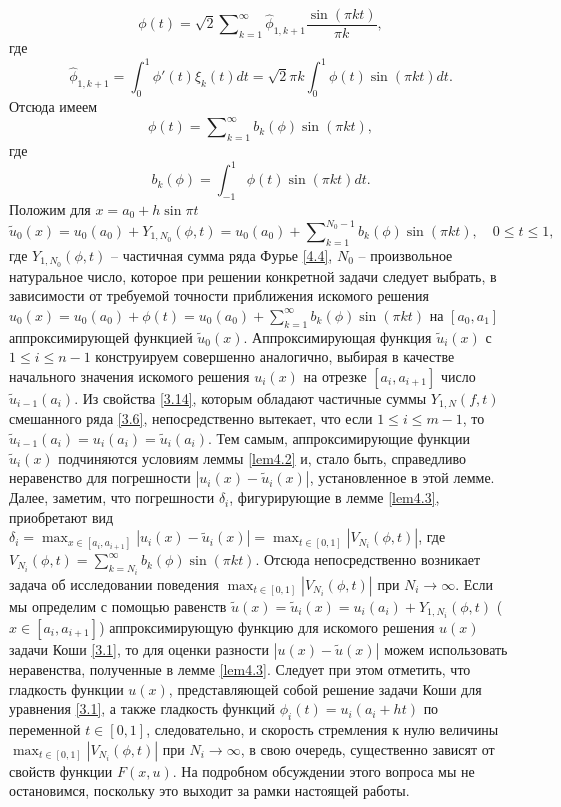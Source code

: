 \documentclass{article}
\numberwithin{equation}{section}
\theoremstyle{plain}
\theoremstyle{definition}
\begin{document}
\begin{fulltext}
$$
\phi(t)= \sqrt{2} \sum\nolimits_{k=1}^\infty \hat \phi_{1,k+1}\frac{\sin(\pi kt)}{\pi k},
$$
где
$$
\hat \phi_{1,k+1}=\int_{0}^1 \phi'(t)\xi_{k}(t)dt=
\sqrt{2}\pi k\int_{0}^1 \phi(t)\sin(\pi kt)dt.
$$
Отсюда имеем
\begin{equation}\label{4.4}
\phi(t)=  \sum\nolimits_{k=1}^\infty b_k(\phi)\sin(\pi kt),
\end{equation}
где
$$
b_k(\phi)=\int_{-1}^1 \phi(t)\sin(\pi kt)dt.
$$
Положим для $x=a_0+h\sin\pi t$
$$
\tilde u_0(x)=u_0(a_0)+Y_{1,N_0}(\phi, t)=u_0(a_0)+ \sum\nolimits_{k=1}^{N_0-1} b_k(\phi)\sin(\pi kt),\quad 0\le t\le 1,
$$
где $Y_{1,N_0}(\phi, t)$ -- частичная сумма ряда Фурье \eqref{4.4}, $N_0$ -- произвольное натуральное число, которое при решении конкретной задачи следует  выбрать, в зависимости от требуемой точности приближения искомого решения $u_0(x)=u_0(a_0)+\phi(t)=  u_0(a_0)+\sum\nolimits_{k=1}^\infty b_k(\phi)\sin(\pi kt)$ на $[a_0,a_1]$ аппроксимирующей функцией $\tilde u_0(x)$.  Аппроксимирующая функция $\tilde u_i(x)$ с  $1\le i\le n-1$ конструируем совершенно аналогично, выбирая в качестве  начального значения искомого решения $u_i(x)$ на отрезке $[a_i,a_{i+1}]$ число $\tilde u_{i-1}(a_i)$.
Из свойства \eqref{3.14}, которым обладают частичные суммы $Y_{1,N}(f,t)$ смешанного ряда \eqref{3.6}, непосредственно вытекает, что если $1\le i\le m-1$, то $\tilde u_{i-1}(a_i)=u_i(a_i)=\tilde u_i(a_i)$. Тем самым, аппроксимирующие функции  $\tilde u_i(x)$ подчиняются условиям леммы \ref{lem4.2} и, стало быть, справедливо неравенство для погрешности $ |u_i(x)-\tilde u_i(x)|$, установленное в этой лемме. Далее, заметим, что погрешности   $\delta_i $, фигурирующие в лемме  \ref{lem4.3}, приобретают вид $\delta_i=\max_{x\in[a_i,a_{i+1}]}|u_i(x)-\tilde u_i(x)|=\max_{t\in[0,1]}|V_{N_i}(\phi,t)|$, где
 $V_{N_i}(\phi,t)=\sum\nolimits_{k=N_i}^\infty b_k(\phi)\sin(\pi kt)$. Отсюда непосредственно возникает задача об исследовании поведения $\max_{t\in[0,1]}|V_{N_i}(\phi,t)|$ при $N_i\to\infty$.   Если мы определим  с помощью равенств $\tilde u(x)= \tilde u_i(x)=u_i(a_i)+Y_{1,N_i}(\phi, t)$  ($x\in [a_i,a_{i+1}]$)  аппроксимирующую функцию для искомого решения $u(x)$  задачи Коши \eqref{3.1}, то для оценки  разности $|u(x)-\tilde u(x)|$  можем использовать неравенства, полученные в лемме \ref{lem4.3}. Следует при этом отметить, что гладкость функции $u(x)$, представляющей собой решение задачи Коши для уравнения \eqref{3.1}, а также   гладкость функций $\phi_i(t)=u_i(a_i+ht)$ по переменной  $t\in[0,1]$,  следовательно, и скорость стремления к нулю величины $\max_{t\in[0,1]}|V_{N_i}(\phi,t)|$ при $N_i\to\infty$,  в свою очередь, существенно зависят от свойств функции $F(x,u)$. На подробном обсуждении этого вопроса мы не остановимся, поскольку это выходит за рамки настоящей работы.



\end{fulltext}
\end{document}
